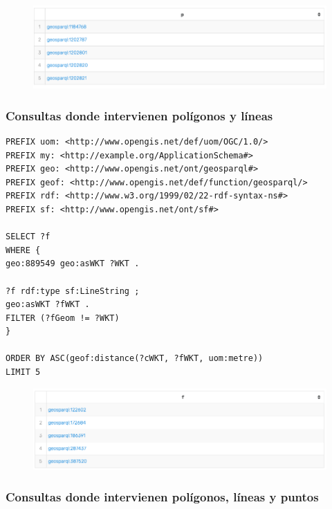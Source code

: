 \begin{figure}[H]
	\centering
	\includegraphics[width=0.9\linewidth]{imagenes/capitulo5/salida11}
	\caption{}
	\label{fig:salida11}
\end{figure}

\subsubsection{Consultas donde intervienen polígonos y líneas}

\begin{lstlisting}
PREFIX uom: <http://www.opengis.net/def/uom/OGC/1.0/>
PREFIX my: <http://example.org/ApplicationSchema#>
PREFIX geo: <http://www.opengis.net/ont/geosparql#>
PREFIX geof: <http://www.opengis.net/def/function/geosparql/>
PREFIX rdf: <http://www.w3.org/1999/02/22-rdf-syntax-ns#>
PREFIX sf: <http://www.opengis.net/ont/sf#>

SELECT ?f
WHERE {
geo:889549 geo:asWKT ?WKT .

?f rdf:type sf:LineString ;
geo:asWKT ?fWKT .
FILTER (?fGeom != ?WKT)
}

ORDER BY ASC(geof:distance(?cWKT, ?fWKT, uom:metre))
LIMIT 5
\end{lstlisting}

\begin{figure}[H]
	\centering
	\includegraphics[width=0.9\linewidth]{imagenes/capitulo5/salida10}
	\caption{}
	\label{fig:salida10}
\end{figure}

\subsubsection{Consultas donde intervienen polígonos, líneas y puntos}


